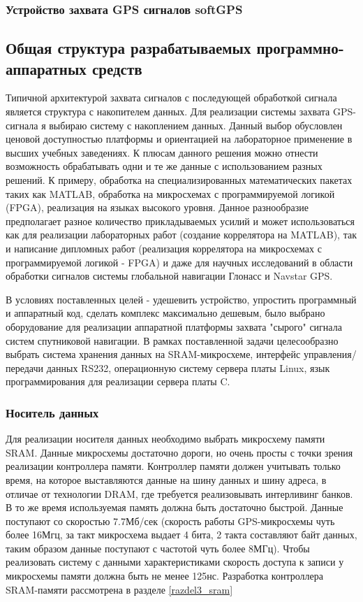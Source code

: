 \subsubsection{Устройство захвата GPS сигналов softGPS}

\subsection{Общая структура разрабатываемых программно-аппаратных средств}
\label{razdel13}
Типичной архитектурой захвата сигналов с последующей обработкой сигнала является структура с накопителем данных.
Для реализации системы захвата GPS-сигнала я выбираю систему с накоплением данных. Данный выбор обусловлен
ценовой доступностью платформы и ориентацией на лабораторное применение в высших учебных заведениях.
К плюсам данного решения можно отнести возможность обрабатывать одни и те же данные с использованием разных решений.
К примеру, обработка на специализированных математических пакетах таких как MATLAB, обработка на микросхемах с
программируемой логикой (FPGA), реализация на языках высокого уровня. Данное разнообразие предполагает разное
количество прикладываемых усилий и может использоваться как для реализации лабораторных работ (создание
коррелятора на MATLAB), так и написание дипломных работ (реализация коррелятора на микросхемах с программируемой
логикой - FPGA) и даже для научных исследований в области обработки сигналов системы глобальной навигации
Глонасс и Navstar GPS.

В условиях поставленных целей - удешевить устройство, упростить программный и аппаратный код, сделать
комплекс максимально дешевым, было выбрано оборудование для реализации аппаратной платформы захвата "сырого"
сигнала систем спутниковой навигации. В рамках поставленной задачи целесообразно выбрать система хранения данных
на SRAM-микросхеме, интерфейс управления/передачи данных RS232, операционную систему
сервера платы Linux, язык программирования для реализации сервера платы C.

\subsubsection{Носитель данных}
\label{razdel1_sram}
Для реализации носителя данных необходимо выбрать микросхему памяти SRAM. Данные микросхемы достаточно дороги,
но очень просты с точки зрения реализации контроллера памяти. Контроллер памяти должен учитывать только время,
на которое выставляются данные на шину данных и шину адреса, в отличае от технологии DRAM, где требуется реализовывать
интерливинг банков. В то же время используемая память должна быть достаточно быстрой. Данные поступают со
скоростью 7.7Мб/сек (скорость работы GPS-микросхемы чуть более 16Мгц, за такт микросхема выдает 4 бита, 2 такта
составляют байт данных, таким образом данные поступают с частотой чуть более 8МГц). Чтобы реализовать систему
с данными характеристиками скорость доступа к записи у микросхемы памяти должна быть не менее 125нс.
Разработка контроллера SRAM-памяти рассмотрена в разделе \ref{razdel3_sram}

